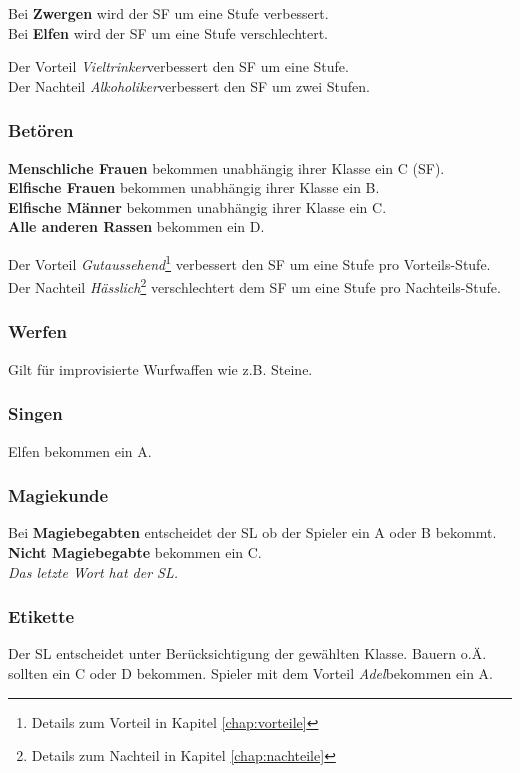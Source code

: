 Bei \textbf{Zwergen} wird der SF um eine Stufe verbessert. \\
Bei \textbf{Elfen} wird der SF um eine Stufe verschlechtert. 

Der Vorteil \textit{Vieltrinker}\footnotemark[4] verbessert den SF um eine Stufe. \\
Der Nachteil \textit{Alkoholiker}\footnotemark[5] verbessert den SF um zwei Stufen. 

\subsubsection{Betören}
\textbf{Menschliche Frauen} bekommen unabhängig ihrer Klasse ein C (SF). \\
\textbf{Elfische Frauen} bekommen unabhängig ihrer Klasse ein B. \\
\textbf{Elfische Männer} bekommen unabhängig ihrer Klasse ein C. \\
\textbf{Alle anderen Rassen} bekommen ein D. 

Der Vorteil \textit{Gutaussehend}\footnote{Details zum Vorteil in Kapitel \ref{chap:vorteile}} verbessert den SF um eine Stufe pro Vorteils-Stufe. \\
Der Nachteil \textit{Hässlich}\footnote{Details zum Nachteil in Kapitel \ref{chap:nachteile}} verschlechtert dem SF um eine Stufe pro Nachteils-Stufe. 

\subsubsection{Werfen}
Gilt für improvisierte Wurfwaffen wie z.B. Steine.

\subsubsection{Singen}
Elfen bekommen ein A.

\subsubsection{Magiekunde}
Bei \textbf{Magiebegabten} entscheidet der SL ob der Spieler ein A oder B bekommt. \\
\textbf{Nicht Magiebegabte} bekommen ein C. \\
\textit{Das letzte Wort hat der SL.}

\subsubsection{Etikette}
Der SL entscheidet unter Berücksichtigung der gewählten Klasse. Bauern o.Ä. sollten ein C oder D bekommen. Spieler mit dem Vorteil \textit{Adel}\footnotemark[4] bekommen ein A.

